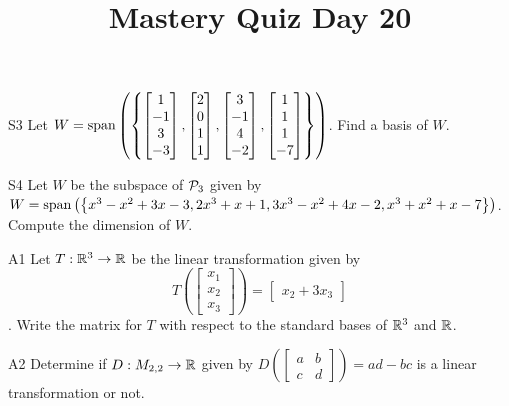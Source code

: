 \documentclass{sbgLAquiz}
\title{Mastery Quiz Day 20 }
\begin{document}
\begin{problem}{S3}
Let $W={\rm span}\left( \left\{ \begin{bmatrix} 1 \\ -1 \\ 3 \\ -3 \end{bmatrix},\begin{bmatrix} 2 \\ 0 \\ 1 \\ 1 \end{bmatrix}, \begin{bmatrix} 3 \\ -1 \\ 4 \\ -2 \end{bmatrix},  \begin{bmatrix} 1 \\ 1 \\ 1 \\ -7 \end{bmatrix} \right\}\right)$.  Find a basis of $W$.
\end{problem}

\begin{problem}{S4}
Let $W$ be the subspace of $\P_3$ given by $W={\rm span}\left( \left\{ x^3-x^2+3x-3, 2x^3+x+1, 3x^3-x^2+4x-2, x^3+x^2+x-7\right\}\right)$.  Compute the dimension of $W$.
\end{problem}
\newpage

\begin{problem}{A1}
Let $T: \IR^3 \rightarrow \IR$ be the linear transformation given by $$T\left(\begin{bmatrix} x_1 \\ x_2 \\ x_3  \end{bmatrix} \right) = \begin{bmatrix} x_2+3x_3 \end{bmatrix}$$. Write the matrix for $T$ with respect to the standard bases of $\IR^3$ and $\IR$.
\end{problem}

\begin{problem}{A2}
Determine if $D: M_{2,2} \rightarrow \IR$ given by $D\left(\begin{bmatrix} a & b \\ c & d \end{bmatrix} \right) = ad-bc$ is a linear transformation or not.
\end{problem}
\end{document}
